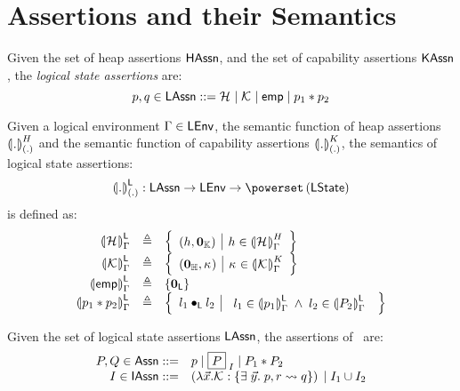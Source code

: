 \section*{Assertions and their Semantics}
\begin{definition}
Given the set of heap assertions $\HAssertions$, and the set of capability assertions $\KAssertions$, the \emph{logical state assertions} are:
%
\[
	p, q \in \LAssertions ::= \heapAss{} \;|\; \capAss{} \;|\; \emp \;|\;  p_1 * p_2
\]
%
\end{definition}
\begin{definition}
Given a logical environment $\lenv \in \LEnv$, the semantic function of heap assertions $\semH[\blankArg]{.}$ and the semantic function of capability assertions $\semK[\blankArg]{.}$, the semantics of logical state assertions:
%
\[
	\semL[\blankArg]{.} : \LAssertions \rightarrow \LEnv \rightarrow \pset{\LState}
\]
%
is defined as:
\[
\begin{array}{r c l}
	
	\semL{\heapAss{}} & \eqdef & 
	\left\{
	\begin{array}{l | l}
	 \left(h, \unitCap \right) &
	 h \in \semH{\heapAss{}}
	\end{array}
	\right\}\\
	
	\semL{\capAss{}} & \eqdef & 
	\left\{
	\begin{array}{l | l}
	 \left( \unitH, \ca{} \right) &
	 \ca{} \in \semK{\capAss{}}
	\end{array}
	\right\}\\


	\semL{\emp} & \eqdef & \{\unitL\}\\


	\semL{p_1 * p_2} & \eqdef & 
	\left\{ 
	\begin{array}{l | l}
		l_1 \composeL l_2 & 
		\begin{array}{l}
				 l_1 \in \semL{p_1} \;\land\;
				 l_2 \in \semL{P_2}
		\end{array}
	\end{array} \right\}
\end{array}
\]
%
\end{definition}
%
%
\begin{definition}[Assertions]
Given the set of logical state assertions $\LAssertions$, the assertions of \colosl\ are:
%
\[
\begin{array}{r l}
	P, Q \in \Assertions ::= & p \;|\; \shared{P}{I} \;|\; P_1 * P_2\\
	I \in \IAssertions ::= & 
	\left( \condInterAss{\vec{x}}{\capAss{}}{\vec{y}}{p}{r}{q} \right)
	\;|\; I_1 \cup I_2
\end{array}
\]
%
\end{definition}
